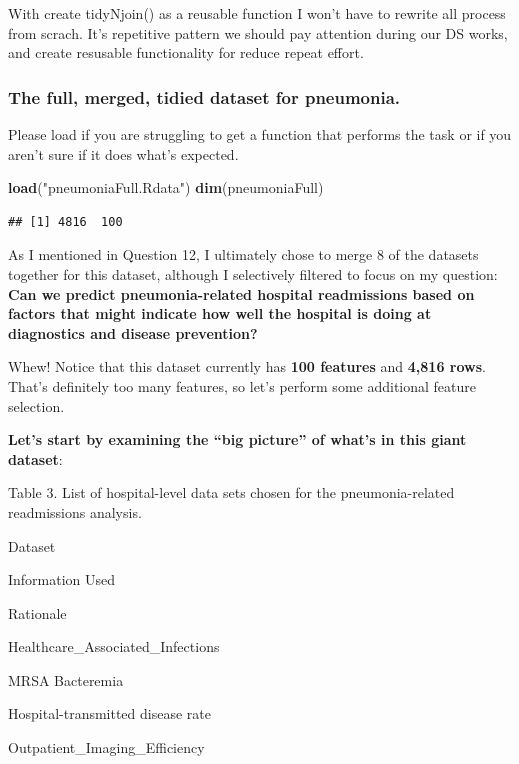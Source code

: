 \documentclass[
]{article}
\newenvironment{Shaded}{\begin{snugshade}}{\end{snugshade}}
\newcommand{\FunctionTok}[1]{\textcolor[rgb]{0.13,0.29,0.53}{\textbf{#1}}}
\newcommand{\NormalTok}[1]{#1}
\newcommand{\StringTok}[1]{\textcolor[rgb]{0.31,0.60,0.02}{#1}}
\begin{document}
With create tidyNjoin() as a reusable function I won't have to rewrite
all process from scrach. It's repetitive pattern we should pay attention
during our DS works, and create resusable functionality for reduce
repeat effort.

\subsubsection{The full, merged, tidied dataset for
pneumonia.}\label{the-full-merged-tidied-dataset-for-pneumonia.}

Please load if you are struggling to get a function that performs the
task or if you aren't sure if it does what's expected.

\begin{Shaded}
\begin{Highlighting}[]
\FunctionTok{load}\NormalTok{(}\StringTok{"pneumoniaFull.Rdata"}\NormalTok{)}
\FunctionTok{dim}\NormalTok{(pneumoniaFull)}
\end{Highlighting}
\end{Shaded}

\begin{verbatim}
## [1] 4816  100
\end{verbatim}

As I mentioned in Question 12, I ultimately chose to merge 8 of the
datasets together for this dataset, although I selectively filtered to
focus on my question: \textbf{Can we predict pneumonia-related hospital
readmissions based on factors that might indicate how well the hospital
is doing at diagnostics and disease prevention?}

Whew! Notice that this dataset currently has \textbf{100 features} and
\textbf{4,816 rows}. That's definitely too many features, so let's
perform some additional feature selection.

\textbf{Let's start by examining the ``big picture'' of what's in this
giant dataset}:

Table 3. List of hospital-level data sets chosen for the
pneumonia-related readmissions analysis.

Dataset

Information Used

Rationale

Healthcare\_Associated\_Infections

MRSA Bacteremia

Hospital-transmitted disease rate

Outpatient\_Imaging\_Efficiency
\end{document}
